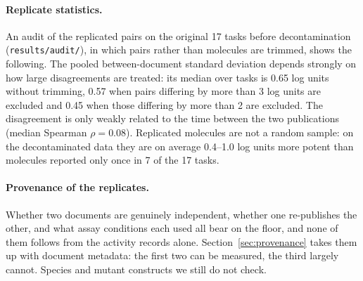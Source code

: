 \paragraph{Replicate statistics.}
An audit of the replicated pairs on the original 17 tasks before decontamination (\texttt{results/audit/}), in which pairs rather than molecules are trimmed, shows the following. The pooled between-document standard deviation depends strongly on how large disagreements are treated: its median over tasks is 0.65 log units without trimming, 0.57 when pairs differing by more than 3 log units are excluded and 0.45 when those differing by more than 2 are excluded. The disagreement is only weakly related to the time between the two publications (median Spearman $\rho=0.08$). Replicated molecules are not a random sample: on the decontaminated data they are on average 0.4--1.0 log units more potent than molecules reported only once in 7 of the 17 tasks.

\paragraph{Provenance of the replicates.} Whether two documents are genuinely independent, whether one re-publishes the other, and what assay conditions each used all bear on the floor, and none of them follows from the activity records alone. Section~\ref{sec:provenance} takes them up with document metadata: the first two can be measured, the third largely cannot. Species and mutant constructs we still do not check.
